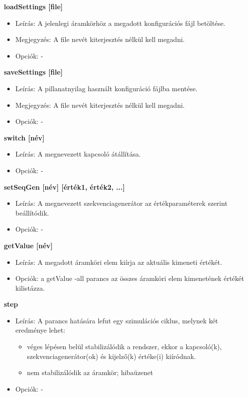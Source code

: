 \textbf{loadSettings [file]}
\begin{itemize}
	\item Leírás: A jelenlegi áramkörhöz a megadott konfigurációs fájl betöltése.
	\item Megjegyzés: A file nevét kiterjesztés nélkül kell megadni.
	\item Opciók: -
\end{itemize}

\textbf{saveSettings [file]}
\begin{itemize}
	\item Leírás: A pillanatnyilag használt konfiguráció fájlba mentése.
	\item Megjegyzés: A file nevét kiterjesztés nélkül kell megadni.
	\item Opciók: -
\end{itemize}

\textbf{switch [név]}
\begin{itemize}
	\item Leírás: A megnevezett kapcsoló átállítása.
	\item Opciók: -
\end{itemize}

\textbf{setSeqGen [név] [érték1, érték2, ...]}
\begin{itemize}
	\item Leírás: A megnevezett szekvenciagenerátor az értékparaméterek szerint beállítódik.
	\item Opciók: -
\end{itemize}

\textbf{getValue [név]}
\begin{itemize}
	\item Leírás: A megadott áramköri elem kiírja az aktuális kimeneti értékét.
	\item Opciók: a getValue -all parancs az összes áramköri elem kimenetének értékét kilistázza.
\end{itemize}

\textbf{step}
\begin{itemize}
	\item Leírás: A parancs hatására lefut egy szimulációs ciklus, melynek két eredménye lehet:
	\begin{itemize}
		\item véges lépésen belül stabilizálódik a rendszer, ekkor a kapcsoló(k), szekvenciagenerátor(ok) és kijelző(k) értéke(i) kiíródnak.
		\item nem stabilizálódik az áramkör; hibaüzenet
	\end{itemize} 
	\item Opciók: -
\end{itemize}

